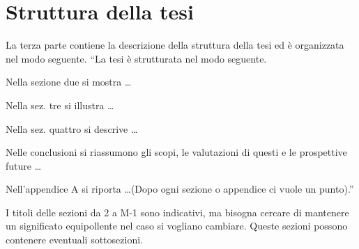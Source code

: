 \section{Struttura della tesi}
La terza parte contiene la descrizione della struttura della tesi ed \`e organizzata nel modo seguente.
``La tesi \`e strutturata nel modo seguente.

Nella sezione due si mostra \dots

Nella sez. tre si illustra \dots

Nella sez. quattro si descrive \dots

Nelle conclusioni si riassumono gli scopi, le valutazioni di questi e le prospettive future \dots

Nell'appendice A si riporta \dots (Dopo ogni sezione o appendice ci vuole un punto).''

I titoli delle sezioni da 2 a M-1 sono indicativi, ma bisogna cercare di mantenere un significato equipollente nel caso si vogliano cambiare. Queste sezioni possono contenere eventuali sottosezioni.


